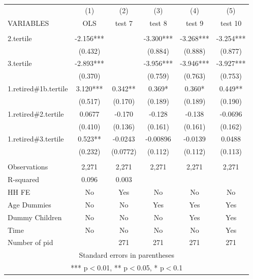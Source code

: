 \begin{tabular}{lccccc} \hline
 & (1) & (2) & (3) & (4) & (5) \\
VARIABLES & OLS & test 7 & test 8 & test 9 & test 10 \\ \hline
 &  &  &  &  &  \\
2.tertile & -2.156*** &  & -3.300*** & -3.268*** & -3.254*** \\
 & (0.432) &  & (0.884) & (0.888) & (0.877) \\
3.tertile & -2.893*** &  & -3.956*** & -3.946*** & -3.927*** \\
 & (0.370) &  & (0.759) & (0.763) & (0.753) \\
1.retired\#1b.tertile & 3.120*** & 0.342** & 0.369* & 0.360* & 0.449** \\
 & (0.517) & (0.170) & (0.189) & (0.189) & (0.190) \\
1.retired\#2.tertile & 0.0677 & -0.170 & -0.128 & -0.138 & -0.0696 \\
 & (0.410) & (0.136) & (0.161) & (0.161) & (0.162) \\
1.retired\#3.tertile & 0.523** & -0.0243 & -0.00896 & -0.0139 & 0.0488 \\
 & (0.232) & (0.0772) & (0.112) & (0.112) & (0.113) \\
 &  &  &  &  &  \\
Observations & 2,271 & 2,271 & 2,271 & 2,271 & 2,271 \\
R-squared & 0.096 & 0.003 &  &  &  \\
HH FE & No & Yes & No & No & No \\
Age Dummies & No & No & Yes & Yes & Yes \\
Dummy Children & No & No & No & Yes & Yes \\
Time & No & No & No & No & Yes \\
 Number of pid &  & 271 & 271 & 271 & 271 \\ \hline
\multicolumn{6}{c}{ Standard errors in parentheses} \\
\multicolumn{6}{c}{ *** p$<$0.01, ** p$<$0.05, * p$<$0.1} \\
\end{tabular}
